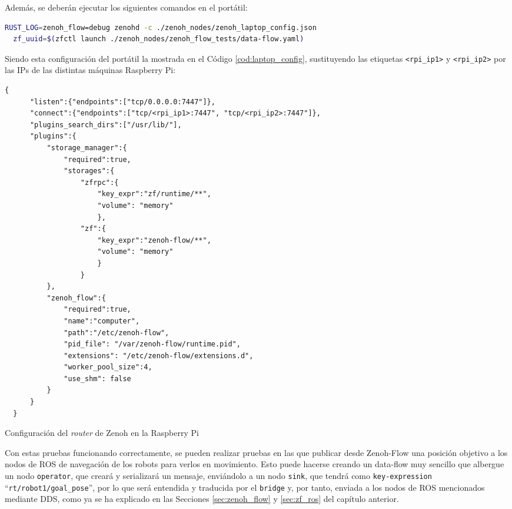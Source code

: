 Además, se deberán ejecutar los siguientes comandos en el portátil:
\begin{lstlisting}[language=bash]
  RUST_LOG=zenoh_flow=debug zenohd -c ./zenoh_nodes/zenoh_laptop_config.json
  zf_uuid=$(zfctl launch ./zenoh_nodes/zenoh_flow_tests/data-flow.yaml)
\end{lstlisting}

Siendo esta configuración del portátil la mostrada en el Código
\ref{cod:laptop_config}, sustituyendo las etiquetas \verb|<rpi_ip1>| y
\verb|<rpi_ip2>| por las IPs de las distintas máquinas Raspberry Pi:
\\

\begin{code}[h!]
  \begin{lstlisting}[style=json]
    {
      "listen":{"endpoints":["tcp/0.0.0.0:7447"]},
      "connect":{"endpoints":["tcp/<rpi_ip1>:7447", "tcp/<rpi_ip2>:7447"]},
      "plugins_search_dirs":["/usr/lib/"],
      "plugins":{
          "storage_manager":{
              "required":true,
              "storages":{
                  "zfrpc":{
                      "key_expr":"zf/runtime/**",
                      "volume": "memory"
                      },
                  "zf":{
                      "key_expr":"zenoh-flow/**",
                      "volume": "memory"
                      }
                  }
          },
          "zenoh_flow":{
              "required":true,
              "name":"computer",
              "path":"/etc/zenoh-flow",
              "pid_file": "/var/zenoh-flow/runtime.pid",
              "extensions": "/etc/zenoh-flow/extensions.d",
              "worker_pool_size":4,
              "use_shm": false
          }
      }
  }
  \end{lstlisting}
\caption[Configuración del \textit{router} de Zenoh en la Raspberry Pi]{Configuración del \textit{router} de Zenoh en la Raspberry Pi}
\label{cod:laptop_config}
\end{code}

Con estas pruebas funcionando correctamente, se pueden realizar pruebas en las
que publicar desde Zenoh-Flow una posición objetivo a los nodos de ROS de
navegación de los robots para verlos en movimiento.
Esto puede hacerse creando un data-flow muy sencillo que albergue un nodo
\texttt{operator}, que creará y serializará un mensaje, enviándolo a un nodo
\texttt{sink}, que tendrá como \texttt{key-expression}
``\texttt{rt/robot1/goal\_pose}'', por lo que será entendida y traducida por el
\texttt{bridge} y, por tanto, enviada a los nodos de ROS mencionados mediante
DDS, como ya se ha explicado en las Secciones \ref{sec:zenoh_flow} y
\ref{sec:zf_ros} del capítulo anterior.
\\

